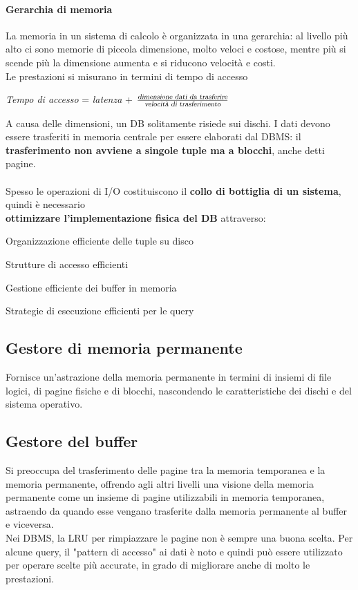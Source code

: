 \documentclass[10pt]{book}
\begin{document}
\paragraph{Gerarchia di memoria} La memoria in un sistema di calcolo è organizzata in una gerarchia: al livello più alto ci sono memorie di piccola dimensione, molto veloci e costose, mentre più si scende più la dimensione aumenta e si riducono velocità e costi.\\
Le prestazioni si misurano in termini di tempo di accesso
\begin{center}
\textsl{Tempo di accesso} = \textsl{latenza} + $\frac{\textsl{dimensione dati da trasferire}}{\textsl{velocità di trasferimento}}$
\end{center}
A causa delle dimensioni, un DB solitamente risiede sui dischi. I dati devono essere trasferiti in memoria centrale per essere elaborati dal DBMS: il \textbf{trasferimento non avviene a singole tuple ma a blocchi}, anche detti pagine.\\\\
\pagebreak
Spesso le operazioni di I/O costituiscono il \textbf{collo di bottiglia di un sistema}, quindi è necessario\\\textbf{ottimizzare l'implementazione fisica del DB} attraverso:
\begin{list}{}{}
	\item Organizzazione efficiente delle tuple su disco
	\item Strutture di accesso efficienti
	\item Gestione efficiente dei buffer in memoria
	\item Strategie di esecuzione efficienti per le query
\end{list}
\subsection{Gestore di memoria permanente} Fornisce un'astrazione della memoria permanente in termini di insiemi di file logici, di pagine fisiche e di blocchi, nascondendo le caratteristiche dei dischi e del sistema operativo.
\subsection{Gestore del buffer} Si preoccupa del trasferimento delle pagine tra la memoria temporanea e la memoria permanente, offrendo agli altri livelli una visione della memoria permanente come un insieme di pagine utilizzabili in memoria temporanea, astraendo da quando esse vengano trasferite dalla memoria permanente al buffer e viceversa.\\
Nei DBMS, la LRU per rimpiazzare le pagine non è sempre una buona scelta. Per alcune query, il "pattern di accesso" ai dati è noto e quindi può essere utilizzato per operare scelte più accurate, in grado di migliorare anche di molto le prestazioni.
\end{document}
